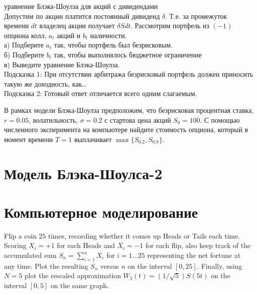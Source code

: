 \begin{problem}
 уравнение Блэка-Шоулза для акций с дивидендами \\
Допустим по акции платится постоянный дивиденд $\delta$. Т.е. за промежуток времени $dt$ владелец акции получает $\delta Sdt$. Рассмотрим портфель из $(-1)$ опциона колл, $a_{t}$ акций и $b_{t}$ наличности. \\
а) Подберите $a_{t}$ так, чтобы портфель был безрисковым. \\
б) Подберите $b_{t}$ так, чтобы выполнялось бюджетное ограничение \\
в) Выведите уравнение Блэка-Шоулза. \\
Подсказка 1: При отсутствии арбитража безрисковый портфель должен приносить такую же доходность, как\ldots \\
Подсказка 2: Готовый ответ отличается всего одним слагаемым.

\begin{sol}

\end{sol}
\end{problem}

\begin{problem}
В рамках модели Блэка-Шоулза предположим, что безрисковая процентная ставка, $r=0.05$, волатильность, $\sigma=0.2$ с стартова цена акций $S_0=100$. С помощью численного эксперимента на компьютере найдите стоимость опциона, который в момент времени $T=1$ выплачивает $\max\{ S_{0.2},S_{0.8}\}$.

\begin{sol}
\end{sol}
\end{problem}


\section{Модель Блэка-Шоулса-2}


\section{Компьютерное моделирование}

\begin{problem}
  Flip a coin $25$ times, recording whether it comes up Heads  or Tails each time.  Scoring $X_i = +1$ for each Heads and $X_i = -1$ for each flip, also keep track of the accumulated sum $S_n = \sum_{i=1}^n X_i$ for $i = 1 \dots 25$ representing the net fortune at any time.  Plot the resulting $S_n$ versus $n$ on the interval   $[0,25]$.  Finally, using $N=5$ plot the rescaled approximation  $W_5(t) = (1/\sqrt{5}) S(5t)$ on the interval $[0,5]$ on the same graph.

\begin{sol}
\end{sol}
\end{problem}





